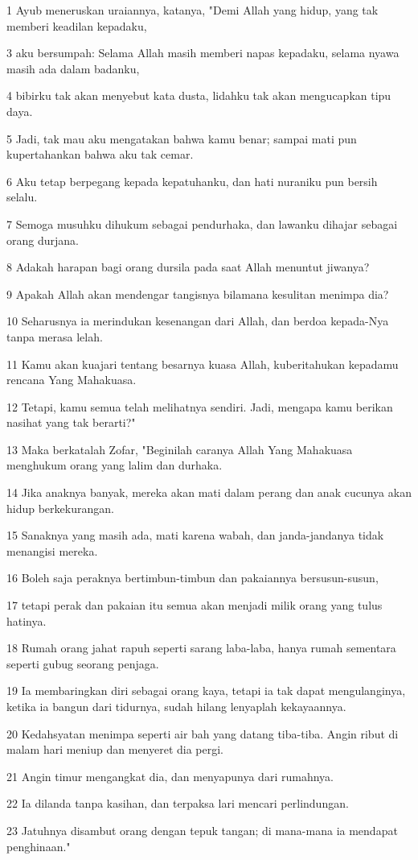 \par 1 Ayub meneruskan uraiannya, katanya, "Demi Allah yang hidup, yang tak memberi keadilan kepadaku,
\par 3 aku bersumpah: Selama Allah masih memberi napas kepadaku, selama nyawa masih ada dalam badanku,
\par 4 bibirku tak akan menyebut kata dusta, lidahku tak akan mengucapkan tipu daya.
\par 5 Jadi, tak mau aku mengatakan bahwa kamu benar; sampai mati pun kupertahankan bahwa aku tak cemar.
\par 6 Aku tetap berpegang kepada kepatuhanku, dan hati nuraniku pun bersih selalu.
\par 7 Semoga musuhku dihukum sebagai pendurhaka, dan lawanku dihajar sebagai orang durjana.
\par 8 Adakah harapan bagi orang dursila pada saat Allah menuntut jiwanya?
\par 9 Apakah Allah akan mendengar tangisnya bilamana kesulitan menimpa dia?
\par 10 Seharusnya ia merindukan kesenangan dari Allah, dan berdoa kepada-Nya tanpa merasa lelah.
\par 11 Kamu akan kuajari tentang besarnya kuasa Allah, kuberitahukan kepadamu rencana Yang Mahakuasa.
\par 12 Tetapi, kamu semua telah melihatnya sendiri. Jadi, mengapa kamu berikan nasihat yang tak berarti?"
\par 13 Maka berkatalah Zofar, "Beginilah caranya Allah Yang Mahakuasa menghukum orang yang lalim dan durhaka.
\par 14 Jika anaknya banyak, mereka akan mati dalam perang dan anak cucunya akan hidup berkekurangan.
\par 15 Sanaknya yang masih ada, mati karena wabah, dan janda-jandanya tidak menangisi mereka.
\par 16 Boleh saja peraknya bertimbun-timbun dan pakaiannya bersusun-susun,
\par 17 tetapi perak dan pakaian itu semua akan menjadi milik orang yang tulus hatinya.
\par 18 Rumah orang jahat rapuh seperti sarang laba-laba, hanya rumah sementara seperti gubug seorang penjaga.
\par 19 Ia membaringkan diri sebagai orang kaya, tetapi ia tak dapat mengulanginya, ketika ia bangun dari tidurnya, sudah hilang lenyaplah kekayaannya.
\par 20 Kedahsyatan menimpa seperti air bah yang datang tiba-tiba. Angin ribut di malam hari meniup dan menyeret dia pergi.
\par 21 Angin timur mengangkat dia, dan menyapunya dari rumahnya.
\par 22 Ia dilanda tanpa kasihan, dan terpaksa lari mencari perlindungan.
\par 23 Jatuhnya disambut orang dengan tepuk tangan; di mana-mana ia mendapat penghinaan."

